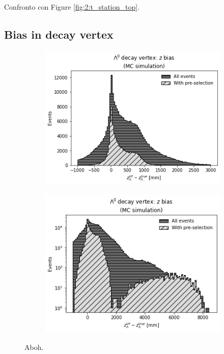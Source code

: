 Confronto con Figure \ref{fig:2:t_station_top}.

\subsection{Bias in \texorpdfstring{\lz}{Lambda} decay vertex}
\label{sec:lambda_endvertex_bias}
\begin{figure}[t]
	\centering
	\begin{subfigure}{.45\textwidth}
		\includegraphics[width=\textwidth]{graphics/04-event_selection/LEVz_MC_true-residuals.png}
		\caption{}
	\end{subfigure}
	\begin{subfigure}{.45\textwidth}
		\includegraphics[width=\textwidth]{graphics/04-event_selection/LEVz_MC_true-residuals_log.png}
		\caption{}
	\end{subfigure}
	\caption{Aboh.}
\end{figure}

